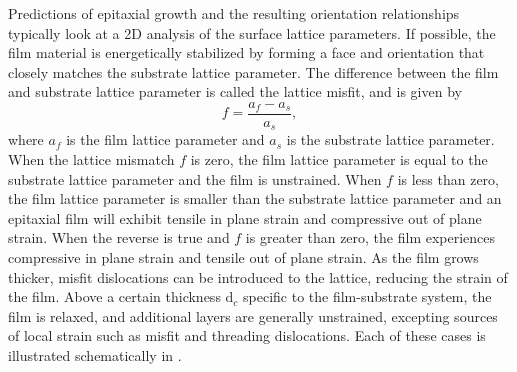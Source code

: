 Predictions of epitaxial growth and the resulting orientation relationships typically look
at a 2\textsc{D} analysis of the surface lattice parameters. If possible, the film
material is energetically stabilized by forming a face and orientation that closely
matches the substrate lattice parameter. The difference between the film and substrate
lattice parameter is called the lattice misfit, and is given by 
\begin{equation}
f=\frac{a_{f}-a_{s}}{a_{s}},
\end{equation}
where $a_{f}$ is the film lattice parameter and $a_{s}$ is the substrate lattice
parameter.\cite{Opel:2012ge} When the lattice mismatch $f$ is zero, the film lattice
parameter is equal to the substrate lattice parameter and the film is unstrained. When $f$
is less than zero, the film lattice parameter is smaller than the substrate lattice
parameter and an epitaxial film will exhibit tensile in plane strain and compressive out
of plane strain. When the reverse is true and $f$ is greater than zero, the film
experiences compressive in plane strain and tensile out of plane strain. As the film grows
thicker, misfit dislocations can be introduced to the lattice, reducing the strain of the
film. Above a certain thickness d$_{c}$ specific to the film-substrate system, the film is
relaxed, and additional layers are generally unstrained, excepting sources of local strain
such as misfit and threading dislocations. Each of these cases is illustrated
schematically in .
